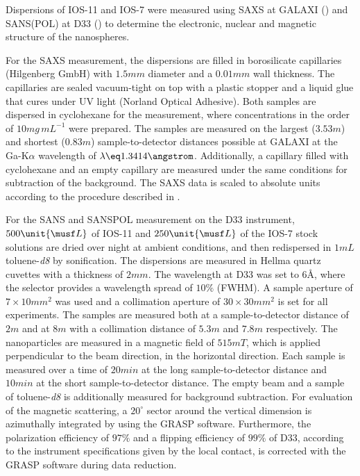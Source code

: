 \documentclass[\main/dresen_thesis.tex]{subfiles}
\begin{document}
    Dispersions of IOS-11 and IOS-7 were measured using SAXS at GALAXI () and SANS(POL) at D33 () to determine the electronic, nuclear and magnetic structure of the nanospheres.

    For the SAXS measurement, the dispersions are filled in borosilicate capillaries (Hilgenberg GmbH) with $1.5 \unit{mm}$ diameter and a $0.01 \unit{mm}$ wall thickness.
    The capillaries are sealed vacuum-tight on top with a plastic stopper and a liquid glue that cures under UV light (Norland Optical Adhesive).
    Both samples are dispersed in cyclohexane for the measurement, where concentrations in the order of $10 \unit{mg \, mL^{-1}}$ were prepared.
    The samples are measured on the largest ($3.53 \unit{m}$) and shortest ($0.83 \unit{m}$) sample-to-detector distances possible at GALAXI at the Ga-K$\alpha$ wavelength of $\lambda \eq 1.3414 \angstrom$.
    Additionally, a capillary filled with cyclohexane and an empty capillary are measured under the same conditions for subtraction of the background.
    The SAXS data is scaled to absolute units according to the procedure described in .

    For the SANS and SANSPOL measurement on the D33 instrument, $500 \unit{\musf L}$ of IOS-11 and $250 \unit{\musf L}$ of the IOS-7 stock solutions are dried over night at ambient conditions, and then redispersed in $1 \unit{mL}$ toluene-\textit{d8} by sonification.
    The dispersions are measured in Hellma quartz cuvettes with a thickness of $2 \unit{mm}$.
    The wavelength at D33 was set to $6 \unit{\angstrom}$, where the selector provides a wavelength spread of $10 \%$ (FWHM).
    A sample aperture  of $7 \times 10 \unit{mm^2}$ was used and a collimation aperture of $30 \times 30 \unit{mm^2}$ is set for all experiments.
    The samples are measured both at a sample-to-detector distance of $2 \unit{m}$ and at $8 \unit{m}$ with a collimation distance of $5.3 \unit{m}$ and $7.8 \unit{m}$ respectively.
    The nanoparticles are measured in a magnetic field of $515 \unit{mT}$, which is applied perpendicular to the beam direction, in the horizontal direction.
    Each sample is measured over a time of $20 \unit{min}$ at the long sample-to-detector distance and $10 \unit{min}$ at the short sample-to-detector distance.
    The empty beam and a sample of toluene-\textit{d8} is additionally measured for background subtraction.
    For evaluation of the magnetic scattering, a $20^\circ$ sector around the vertical dimension is azimuthally integrated by using the GRASP software.
    Furthermore, the polarization efficiency of $97 \%$ and a flipping efficiency of $99 \%$ of D33, according to the instrument specifications given by the local contact, is corrected with the GRASP software during data reduction.
\end{document}

